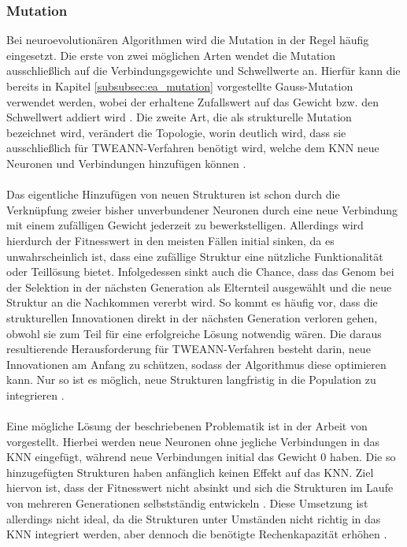 \subsubsection{Mutation}
\label{subsubsec:mutation}
Bei neuroevolutionären Algorithmen wird die Mutation in der Regel häufig eingesetzt. Die erste von zwei möglichen Arten wendet die Mutation ausschließlich auf die Verbindungsgewichte und Schwellwerte an. Hierfür kann die bereits in Kapitel \ref{subsubsec:ea_mutation} vorgestellte Gauss-Mutation verwendet werden, wobei der erhaltene Zufallswert auf das Gewicht bzw. den Schwellwert addiert wird \cite{mcintyre_neatpython}. Die zweite Art, die als strukturelle Mutation bezeichnet wird, verändert die Topologie, worin deutlich wird, dass sie ausschließlich für \ac{TWEANN}-Verfahren benötigt wird, welche dem \ac{KNN} neue Neuronen und Verbindungen hinzufügen können \cite{stanley2002evolving}.
\\\\
Das eigentliche Hinzufügen von neuen Strukturen ist schon durch die Verknüpfung zweier bisher unverbundener Neuronen durch eine neue Verbindung mit einem zufälligen Gewicht jederzeit zu bewerkstelligen. Allerdings wird hierdurch der Fitnesswert in den meisten Fällen initial sinken, da es unwahrscheinlich ist, dass eine zufällige Struktur eine nützliche Funktionalität oder Teillösung bietet. Infolgedessen sinkt auch die Chance, dass das Genom bei der Selektion in der nächsten Generation als Elternteil ausgewählt und die neue Struktur an die Nachkommen vererbt wird. So kommt es häufig vor, dass die strukturellen Innovationen direkt in der nächsten Generation verloren gehen, obwohl sie zum Teil für eine erfolgreiche Lösung notwendig wären. Die daraus resultierende Herausforderung für \ac{TWEANN}-Verfahren besteht darin, neue Innovationen am Anfang zu schützen, sodass der Algorithmus diese optimieren kann. Nur so ist es möglich, neue Strukturen langfristig in die Population zu integrieren \cite{stanley2002evolving}.
\\\\
Eine mögliche Lösung der beschriebenen Problematik ist in der Arbeit von \citeauthor{angeline1994gnarl} vorgestellt. Hierbei werden neue Neuronen ohne jegliche Verbindungen in das \ac{KNN} eingefügt, während neue Verbindungen initial das Gewicht $0$ haben. Die so hinzugefügten Strukturen haben anfänglich keinen Effekt auf das \ac{KNN}. Ziel hiervon ist, dass der Fitnesswert nicht absinkt und sich die Strukturen im Laufe von mehreren Generationen selbstständig entwickeln \cite{angeline1994gnarl}. Diese Umsetzung ist allerdings nicht ideal, da die Strukturen unter Umständen nicht richtig in das \ac{KNN} integriert werden, aber dennoch die benötigte Rechenkapazität erhöhen \cite{stanley2002evolving}.
